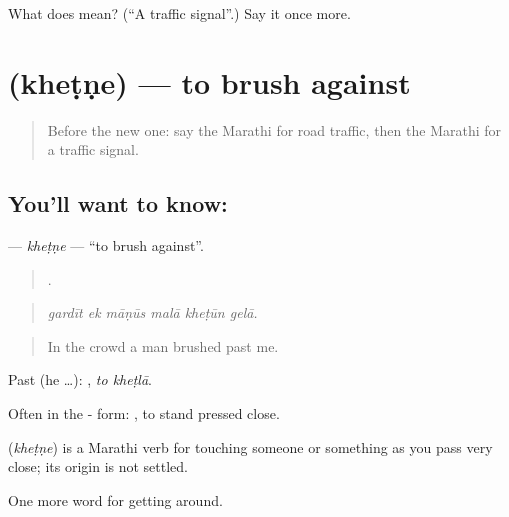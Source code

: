 \begin{tcolorbox}[breakable,colback=teal!4,colframe=teal!35!black,title={Before you move on}]
What does  mean? (\textquotedblleft{}A traffic signal\textquotedblright{}.) Say it once more.
\end{tcolorbox}
\section[\texorpdfstring{\mr{खेटणे} (kheṭṇe)}{खेटणे (kheṭṇe)}]{ (kheṭṇe) — to brush against}

\label{lesson:MR-C404-khetne}



\begin{quote}
Before the new one: say the Marathi for road traffic, then the Marathi for a traffic signal.
\end{quote}

\subsection*{You'll want to know: }
\textbf{} — \emph{kheṭṇe} — \textquotedblleft{}to brush against\textquotedblright{}.

\begin{quote}
     .
\end{quote}

\begin{quote}
\emph{gardīt ek māṇūs malā kheṭūn gelā.}
\end{quote}

\begin{quote}
In the crowd a man brushed past me.
\end{quote}

Past (he …):  , \emph{to kheṭlā}.

Often in the - form:   , to stand pressed close.

\begin{cousinweb}
\textbf{} (\emph{kheṭṇe}) is a Marathi verb for touching someone or something as you pass very close; its origin is not settled.
\end{cousinweb}

\begin{grammarlens}[title={What you've built}]
One more word for getting around.
\end{grammarlens}

